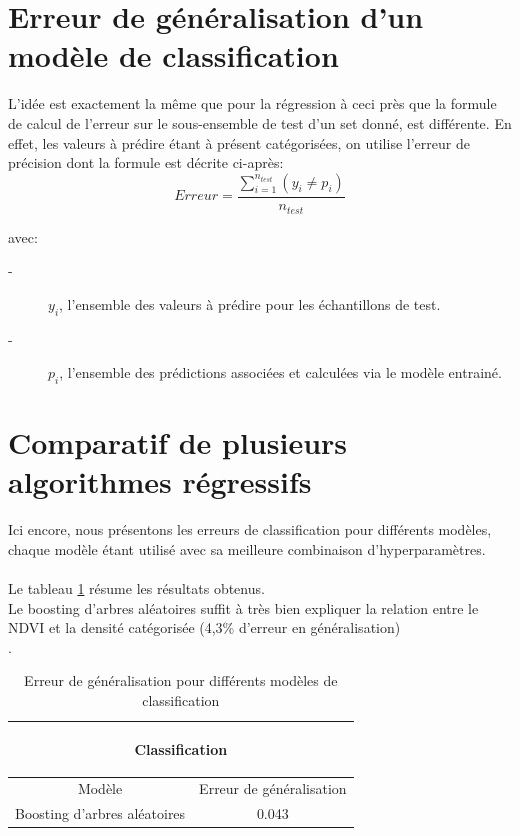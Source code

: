 \documentclass{book}
\begin{document}
\clearpage
 
\section{Erreur de généralisation d'un modèle de classification}

L'idée est exactement la même que pour la régression à ceci près que la formule de calcul de l'erreur sur le sous-ensemble de test d'un set donné, est
différente. En effet, les valeurs à prédire étant à présent catégorisées, on utilise l'erreur de précision dont la formule est décrite ci-après:\\

\begin{equation}
Erreur = \frac{\sum \limits_{\underset{}{i=1}}^{n_{test}} (y_i \neq p_i)}{n_{test}}
\end{equation}

avec:
\begin{description}
\item[-] ${y_i}$, l'ensemble des valeurs à prédire pour les échantillons de test.
\item[-] ${p_i}$, l'ensemble des prédictions associées et calculées via le modèle entrainé.
\end{description}

\section{Comparatif de plusieurs algorithmes régressifs} 

Ici encore, nous présentons les erreurs de classification pour différents modèles, chaque modèle étant utilisé avec sa meilleure combinaison
d'hyperparamètres.\\
\\
Le tableau \ref{classification_resultats} résume les résultats obtenus.\\
Le boosting d'arbres aléatoires suffit à très bien expliquer la relation entre le NDVI et la densité catégorisée (4,3\% d'erreur en généralisation)\\.
\begin{table}[H]
\begin{center}
\begin{adjustbox}{max width=\textwidth}
\begin{tabular}{|c|c|}
\hline
\multicolumn{2}{|c|}{\begin{bf}Classification\end{bf}} \\
\hline 
Modèle & Erreur de généralisation \\
\hline
Boosting d'arbres aléatoires & 0.043\\
\hline
\end{tabular}
\end{adjustbox}
\end{center}
\caption{Erreur de généralisation pour différents modèles de classification}
\label{classification_resultats}
\end{table}
\clearpage
\end{document}

